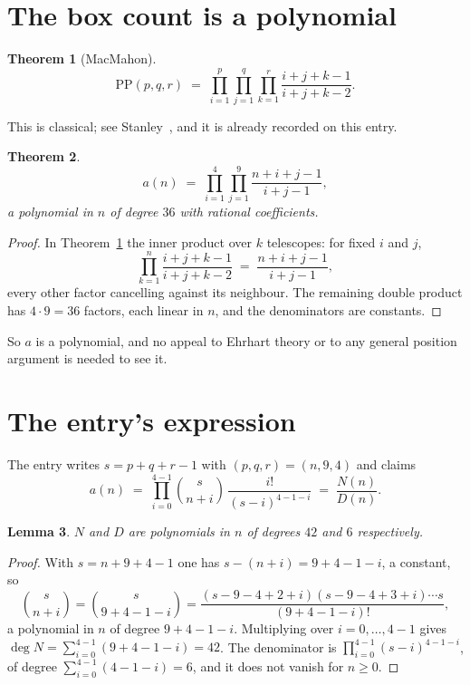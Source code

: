 \documentclass[11pt,a4paper]{article}
\theoremstyle{plain}
\newtheorem{theorem}{Theorem}
\newtheorem{lemma}[theorem]{Lemma}
\theoremstyle{definition}
\begin{document}
\section{The box count is a polynomial}

\begin{theorem}[MacMahon]\label{thm:mm}
\[
\mathrm{PP}(p,q,r)\;=\;\prod_{i=1}^{p}\prod_{j=1}^{q}\prod_{k=1}^{r}
\frac{i+j+k-1}{i+j+k-2} .
\]
\end{theorem}

This is classical; see Stanley~\cite{stanley}, and it is already recorded on this entry.

\begin{theorem}\label{thm:poly}
\[
a(n)\;=\;\prod_{i=1}^{4}\prod_{j=1}^{9}\frac{n+i+j-1}{i+j-1},
\]
a polynomial in $n$ of degree $36$ with rational coefficients.
\end{theorem}

\begin{proof}
In Theorem~\ref{thm:mm} the inner product over $k$ telescopes: for fixed $i$ and $j$,
\[
\prod_{k=1}^{n}\frac{i+j+k-1}{i+j+k-2}\;=\;\frac{n+i+j-1}{i+j-1} ,
\]
every other factor cancelling against its neighbour. The remaining double product has
$4\cdot9=36$ factors, each linear in $n$, and the denominators are constants.
\end{proof}

So $a$ is a polynomial, and no appeal to Ehrhart theory or to any general position argument is
needed to see it.

\section{The entry's expression}

The entry writes $s=p+q+r-1$ with $(p,q,r)=(n,9,4)$ and claims
\[
a(n)\;=\;\prod_{i=0}^{4-1}\binom{s}{n+i}\,\frac{i!}{(s-i)^{4-1-i}}\;=\;
\frac{N(n)}{D(n)} .
\]

\begin{lemma}\label{lem:deg}
$N$ and $D$ are polynomials in $n$ of degrees $42$ and $6$ respectively.
\end{lemma}

\begin{proof}
With $s=n+9+4-1$ one has $s-(n+i)=9+4-1-i$, a constant, so
\[
\binom{s}{n+i}=\binom{s}{9+4-1-i}
=\frac{(s-9-4+2+i)(s-9-4+3+i)\cdots s}{(9+4-1-i)!},
\]
a polynomial in $n$ of degree $9+4-1-i$. Multiplying over $i=0,\dots,4-1$ gives
$\deg N=\sum_{i=0}^{4-1}(9+4-1-i)=42$. The denominator is
$\prod_{i=0}^{4-1}(s-i)^{4-1-i}$, of degree
$\sum_{i=0}^{4-1}(4-1-i)=6$, and it does not vanish for $n\ge0$.
\end{proof}
\end{document}
